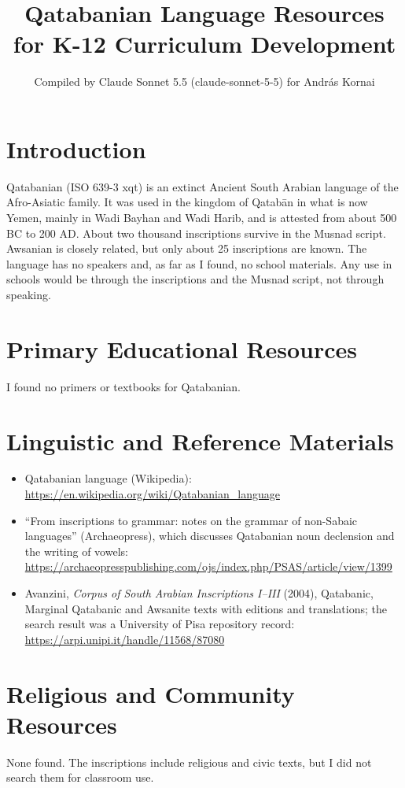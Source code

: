 \documentclass[12pt]{article}
\title{Qatabanian Language Resources for K-12 Curriculum Development}
\author{Compiled by Claude Sonnet 5.5 (claude-sonnet-5-5) for Andr\'as Kornai}
\date{}
\begin{document}
\maketitle

\section{Introduction}
Qatabanian (ISO 639-3 xqt) is an extinct Ancient South Arabian language of the Afro-Asiatic family. It was used in the kingdom of Qatab\=an in what is now Yemen, mainly in Wadi Bayhan and Wadi Harib, and is attested from about 500 BC to 200 AD. About two thousand inscriptions survive in the Musnad script. Awsanian is closely related, but only about 25 inscriptions are known. The language has no speakers and, as far as I found, no school materials. Any use in schools would be through the inscriptions and the Musnad script, not through speaking.

\section{Primary Educational Resources}
I found no primers or textbooks for Qatabanian.

\section{Linguistic and Reference Materials}
\begin{itemize}
\item Qatabanian language (Wikipedia): \url{https://en.wikipedia.org/wiki/Qatabanian_language}
\item ``From inscriptions to grammar: notes on the grammar of non-Sabaic languages'' (Archaeopress), which discusses Qatabanian noun declension and the writing of vowels: \url{https://archaeopresspublishing.com/ojs/index.php/PSAS/article/view/1399}
\item Avanzini, \textit{Corpus of South Arabian Inscriptions I--III} (2004), Qatabanic, Marginal Qatabanic and Awsanite texts with editions and translations; the search result was a University of Pisa repository record: \url{https://arpi.unipi.it/handle/11568/87080}
\end{itemize}

\section{Religious and Community Resources}
None found. The inscriptions include religious and civic texts, but I did not search them for classroom use.
\end{document}
